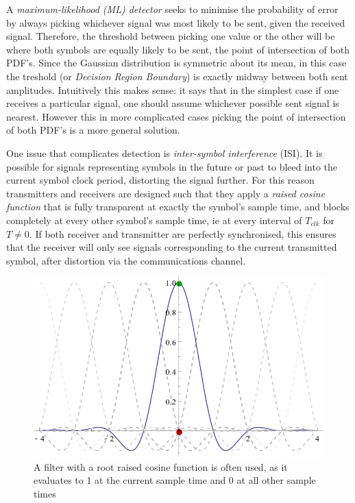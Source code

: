 A \emph{maximum-likelihood (ML) detector} seeks to minimise the probability of
error by always picking whichever signal was most likely to be sent, given
the received signal. Therefore, the threshold between picking one value or the other
will be where both symbols are equally likely to be sent, the point of
intersection of both PDF's. Since the Gaussian distribution is symmetric
about its mean, in this case the treshold (or \emph{Decision Region
Boundary}) is exactly midway between both sent amplitudes. Intuitively
this makes sense: it says that in the simplest case if one receives a particular
signal, one should assume whichever possible sent signal is nearest. However
this in more complicated cases picking the point of intersection of both PDF's
is a more general solution. 

One issue that complicates detection is \emph{inter-symbol
interference} (ISI). It is possible for signals representing symbols in
the future or past to bleed into the current symbol clock period,
distorting the signal further. For this reason transmitters and receivers
are designed such that they apply a \emph{raised cosine function} that
is fully transparent at exactly the symbol's sample time, and blocks
completely at every other symbol's sample time, ie at every interval of
$T_{clk}$ for $T \neq 0$. If both receiver and transmitter are perfectly
synchronised, this ensures that the receiver will only see signals
corresponding to the current transmitted symbol, after distortion via
the communications channel.

\begin{figure}[htbp]
\centering
\includegraphics[width=\linewidth]{rrc_sync.png}
\caption{A filter with a root raised cosine function is often used, as
it evaluates to 1 at the current sample time and 0 at all other sample
times}
\end{figure}

